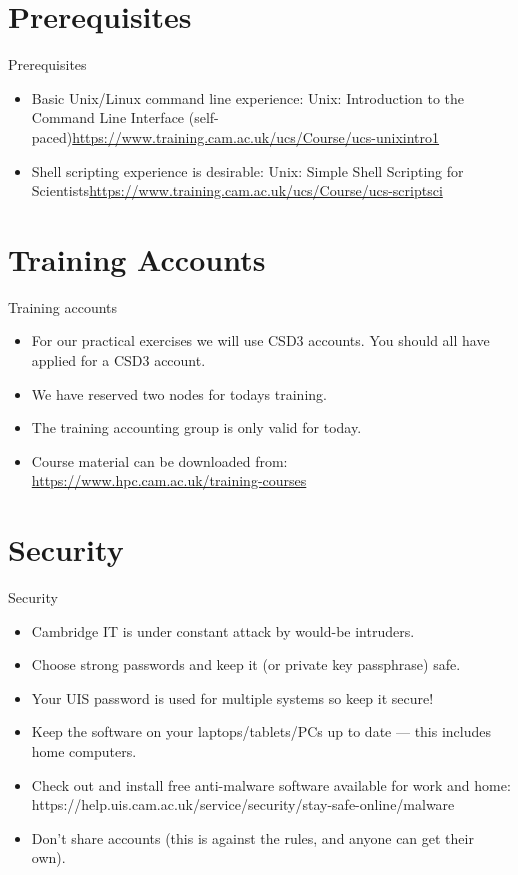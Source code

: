 \section{Prerequisites}
\begin{frame}{Prerequisites}
\begin{itemize}
\item{Basic Unix/Linux command line experience:\hfill\break
\alert{Unix: Introduction to the Command Line Interface (self-paced)}\hfill\break \small\url{https://www.training.cam.ac.uk/ucs/Course/ucs-unixintro1}}
\pause
\item{Shell scripting experience is desirable:\hfill\break
\alert{Unix: Simple Shell Scripting for Scientists}\hfill\break  \small\url{https://www.training.cam.ac.uk/ucs/Course/ucs-scriptsci}}
\end{itemize}
\end{frame}

\section{Training Accounts}
\begin{frame}{Training accounts}
\begin{itemize}
\item{\alert{For our practical exercises we will use CSD3 accounts.} You should all have applied for a CSD3 account.}
\pause
\item{We have reserved two nodes for todays training.}
\pause
\item{The training accounting group is only valid for today.}
\pause
\item Course material can be downloaded from:  \url{https://www.hpc.cam.ac.uk/training-courses}
\end{itemize}
\end{frame}

\section{Security}
\begin{frame}{Security}
\begin{itemize}
\item{Cambridge IT is under constant attack by would-be intruders.}
\pause
\item{\alert{Choose strong passwords and keep it (or private key passphrase) safe.}}
\pause
\item{\alert{Your UIS password is used for multiple systems so keep it secure!}}
\pause
\item{Keep the software on your laptops/tablets/PCs up to date --- this includes home computers.}
  \pause
\item{Check out and install free anti-malware software available for work and home:\hfill
  \null\qquad\alert{\small https://help.uis.cam.ac.uk/service/security/stay-safe-online/malware}}
  \pause
\item{Don't share accounts (this is against the rules, and anyone can get their own).}
\end{itemize}
\end{frame}


